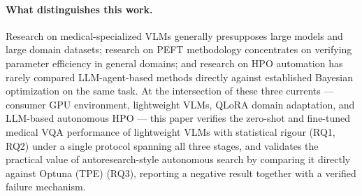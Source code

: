 \paragraph{What distinguishes this work.}
Research on medical-specialized VLMs generally presupposes large models and large
domain datasets; research on PEFT methodology concentrates on verifying parameter
efficiency in general domains; and research on HPO automation has rarely compared
LLM-agent-based methods directly against established Bayesian optimization on the
same task. At the intersection of these three currents --- consumer GPU
environment, lightweight VLMs, QLoRA domain adaptation, and LLM-based autonomous
HPO --- this paper verifies the zero-shot and fine-tuned medical VQA performance
of lightweight VLMs with statistical rigour (RQ1, RQ2) under a single protocol
spanning all three stages, and validates the practical value of
autoresearch-style autonomous search by comparing it directly against Optuna
(TPE) (RQ3), reporting a negative result together with a verified failure
mechanism.
